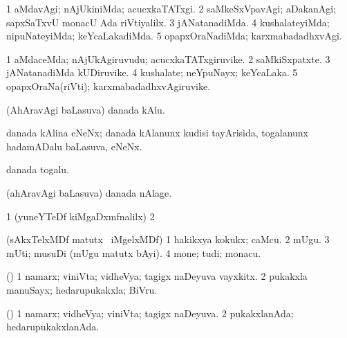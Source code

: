 \bentry
{}
\gl{\kirxvi}
\bmng
\bnum
\num{1} aMdavAgi; nAjUkiniMda; acucxkaTATxgi. 
\num{2} saMkeSxVpavAgi; aDakanAgi; sapxSaTxvU monacU Ada riVtiyalilx. 
\num{3} jANatanadiMda. 
\num{4} kushalateyiMda; nipuNateyiMda; keYcaLakadiMda. 
\num{5} opapxOraNadiMda; karxmabadadhxvAgi. 
\enum
\emng
\eentry

\bentry
{}
\gl{\nA}
\bmng
\bnum
\num{1} aMdaceMda; nAjUkAgiruvudu; acucxkaTATxgiruvike. 
\num{2} saMkiSxpatxte. 
\num{3} jANatanadiMda kUDiruvike. 
\num{4} kushalate; neYpuNayx; keYcaLaka. 
\num{5} opapxOraNa(riVti); karxmabadadhxvAgiruvike. 
\enum
\emng
\eentry

\bentry
{}
\gl{\nA}
\bmng
(AhAravAgi baLasuva) danada kAlu. 
\emng
\eentry

\bentry
{}
\gl{\nA}
\bmng
danada kAlina eNeNx; danada kAlanunx kudisi tayArisida, togalanunx hadamADalu baLasuva, eNeNx. 
\emng
\eentry

\bentry
{}
\gl{\nA}
\bmng
danada togalu. 
\emng
\eentry

\bentry
{}
\gl{\nA}
\bmng
(ahAravAgi baLasuva) danada nAlage. 
\emng
\eentry

\bentry
{}
\gl{\saMkiSx}
\bmng
\bnum
\num{1} (yuneYTeDf kiMgaDxmfnalilx)  
\num{2}  
\enum
\emng
\eentry

\bentry
{}
\gl{\saMkiSx}
\bmng
{} 
\emng
\eentry

\bentry
{}
\gl{\nA}
\bmng
(sAkxTelxMDf matutx \kanu\ iMgelxMDf) 
\bnum
\num{1} hakikxya kokukx; caMcu. 
\num{2} mUgu. 
\num{3} mUti; musuDi (mUgu matutx bAyi). 
\num{4} mone; tudi; monacu. 
\enum
\emng
\eentry

\bentry
{}
\gl{\nA}
\bmng
(\AmA) 
\bnum
\num{1} namarx; viniVta; vidheVya; tagigx naDeyuva vayxkitx. 
\num{2} pukakxla manuSayx; hedarupukakxla; BiVru. 
\enum
\emng
\eentry

\bentry
{}
\gl{\gu}
\bmng
(\AmA) 
\bnum
\num{1} namarx; vidheVya; viniVta; tagigx naDeyuva. 
\num{2} pukakxlanAda; hedarupukakxlanAda. 
\enum
\emng
\eentry

\bentry
{}
\gl{\saMkiSx}
\bmng
{} 
\emng
\eentry

